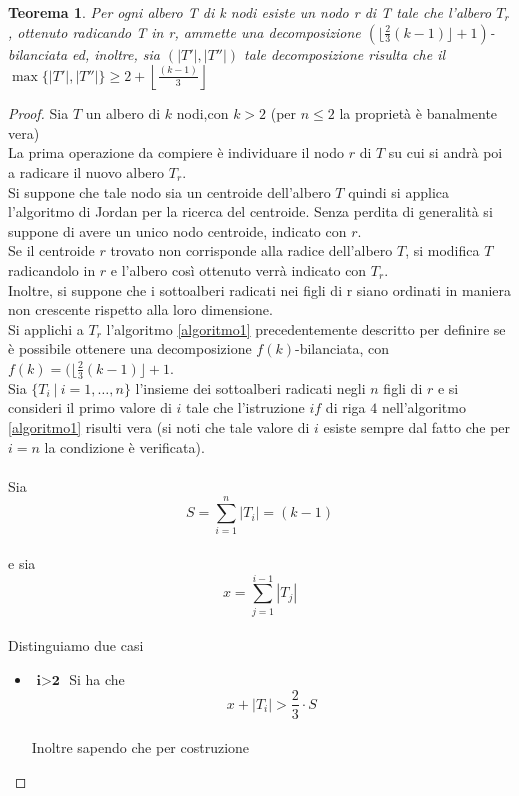 \newtheorem{teorema1}[definizione]{Teorema}
\begin{teorema1}
	\label{teorema1 cap3 sez1}
Per ogni albero T di k nodi esiste un nodo r di T  tale che l'albero $T_r$, ottenuto radicando T in r, ammette una decomposizione $ (\lfloor \frac{2}{3}(k-1) \rfloor + 1)$-bilanciata ed, inoltre, sia $ (|T'|,|T''|)$ tale decomposizione risulta che il $ \max \{|T'|,|T''|\} \ge 2+ \left\lfloor \frac{(k-1)}{3}\right\rfloor $
\end{teorema1}\mbox{}
\begin{proof}
	
	Sia $ T $ un albero di $ k $ nodi,con $ k>2 $ (per $n\le2$ la propriet\`a \`e banalmente vera) \\
	La prima operazione da compiere \`e individuare il nodo $ r $ di $ T $ su cui si andr\`a poi a radicare il nuovo albero $ T_r $.\\
	Si suppone che tale nodo sia un centroide dell'albero $ T $ quindi si applica l'algoritmo di Jordan per la ricerca del centroide. Senza perdita di generalit\`a si suppone di avere un unico nodo centroide, indicato con $ r $.\\
	Se il centroide $ r $ trovato non corrisponde alla radice dell'albero $ T $, si modifica $ T $ radicandolo in $ r $ e l'albero cos\`i ottenuto verr\`a indicato con $ T_r $. \\ 
	Inoltre, si suppone che i sottoalberi radicati nei figli di r siano ordinati in maniera non crescente rispetto alla loro dimensione.\\
	Si applichi a $ T_r $ l'algoritmo \ref{algoritmo1} precedentemente descritto per definire se \`e possibile ottenere una decomposizione $ f(k) $-bilanciata, con $ f(k) =
	(\lfloor \frac{2}{3}(k-1) \rfloor + 1  $.\\
	Sia $ \{T_i \ | \  i=1,\dots,n\} $ l'insieme dei sottoalberi radicati negli $ n $ figli di $ r $ e si consideri il primo valore di $ i $ tale che l'istruzione $ if $ di riga $ 4 $ nell'algoritmo \ref{algoritmo1} risulti vera (si noti che tale valore di $ i $ esiste sempre dal fatto che per $ i = n $ la condizione \`e verificata).\mbox{}\\\\
	Sia 
	\[ S = \sum_{i=1}^{n}{|T_i|} = (k-1 ) \]\\
	e sia
	\[ x = \sum_{j=1}^{i-1}{|T_j|} \]\\
	Distinguiamo due casi
	\begin{itemize}
	\item $\textbf{ i>2 }$ Si ha che
	\\ 
	\begin{equation}\label{1}
		x+|T_i| > \frac{2}{3}\cdot S
	\end{equation}
\\
	Inoltre sapendo che per costruzione
	\\
	

\end{itemize}
\end{proof}
